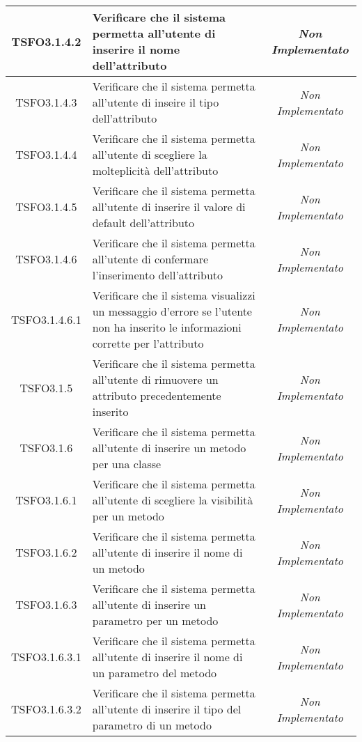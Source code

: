 \begin{longtable}{|c|>{}m{8cm}|c|}
\hypertarget{TSFO3.1.4.2}{TSFO3.1.4.2} & Verificare che il sistema permetta all'utente di inserire il nome dell'attributo & \textit{Non Implementato}\\ \hline
\hypertarget{TSFO3.1.4.3}{TSFO3.1.4.3} & Verificare che il sistema permetta all'utente di inseire il tipo dell'attributo & \textit{Non Implementato}\\ \hline
\hypertarget{TSFO3.1.4.4}{TSFO3.1.4.4} & Verificare che il sistema permetta all'utente di scegliere la molteplicità dell'attributo & \textit{Non Implementato}\\ \hline
\hypertarget{TSFO3.1.4.5}{TSFO3.1.4.5} & Verificare che il sistema permetta all'utente di inserire il valore di default dell'attributo & \textit{Non Implementato}\\ \hline
\hypertarget{TSFO3.1.4.6}{TSFO3.1.4.6} & Verificare che il sistema permetta all'utente di confermare l'inserimento dell'attributo & \textit{Non Implementato}\\ \hline
\hypertarget{TSFO3.1.4.6.1}{TSFO3.1.4.6.1} & Verificare che il sistema visualizzi un messaggio d'errore se l'utente non ha inserito le informazioni corrette per l'attributo & \textit{Non Implementato}\\ \hline
\hypertarget{TSFO3.1.5}{TSFO3.1.5} & Verificare che il sistema permetta all'utente di rimuovere un attributo precedentemente inserito & \textit{Non Implementato}\\ \hline
\hypertarget{TSFO3.1.6}{TSFO3.1.6} & Verificare che il sistema permetta all'utente di inserire un metodo per una classe & \textit{Non Implementato}\\ \hline
\hypertarget{TSFO3.1.6.1}{TSFO3.1.6.1} & Verificare che il sistema permetta all'utente di scegliere la visibilità per un metodo & \textit{Non Implementato}\\ \hline
\hypertarget{TSFO3.1.6.2}{TSFO3.1.6.2} & Verificare che il sistema permetta all'utente di inserire il nome di un metodo & \textit{Non Implementato}\\ \hline
\hypertarget{TSFO3.1.6.3}{TSFO3.1.6.3} & Verificare che il sistema permetta all'utente di inserire un parametro per un metodo & \textit{Non Implementato}\\ \hline
\hypertarget{TSFO3.1.6.3.1}{TSFO3.1.6.3.1} & Verificare che il sistema permetta all'utente di inserire il nome di un parametro del metodo & \textit{Non Implementato}\\ \hline
\hypertarget{TSFO3.1.6.3.2}{TSFO3.1.6.3.2} & Verificare che il sistema permetta all'utente di inserire il tipo del parametro di un metodo & \textit{Non Implementato}\\ \hline

\end{longtable}
